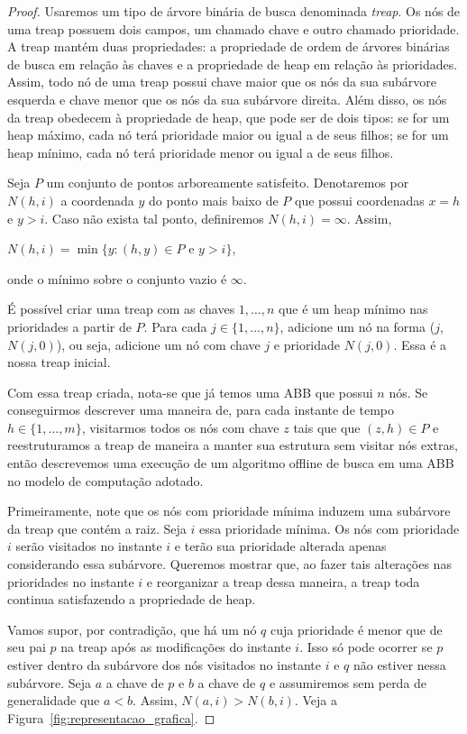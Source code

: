 \begin{proof}
Usaremos um tipo de árvore binária de busca denominada \textit{treap}. Os nós de uma treap possuem dois campos, um chamado chave e outro chamado prioridade. A treap mantém duas propriedades: a propriedade de ordem de árvores binárias de busca em relação às chaves e a propriedade de heap em relação às prioridades. Assim, todo nó de uma treap possui chave maior que os nós da sua subárvore esquerda e chave menor que os nós da sua subárvore direita. Além disso, os nós da treap obedecem à propriedade de heap, que pode ser de dois tipos: se for um heap máximo, cada nó terá prioridade maior ou igual a de seus filhos; se for um heap mínimo, cada nó terá prioridade menor ou igual a de seus filhos.

Seja $P$ um conjunto de pontos arboreamente satisfeito. Denotaremos por $N(h,i)$ a coordenada $y$ do ponto mais baixo de $P$ que possui coordenadas $x = h$ e $y > i$. Caso não exista tal ponto, definiremos $N(h,i) = \infty$. Assim, 
\begin{center}
    $N(h,i) = \min\{y : (h,y) \in P \text{ e } y > i\}$,
\end{center}
onde o mínimo sobre o conjunto vazio é $\infty$.

É possível criar uma treap com as chaves $1,\ldots,n$ que é um heap mínimo nas prioridades a partir de $P$. Para cada $j \in \{1,\ldots,n\}$, adicione um nó na forma ($j$, $N(j,0)$), ou seja, adicione um nó com chave $j$ e prioridade $N(j,0)$. Essa é a nossa treap inicial.

Com essa treap criada, nota-se que já temos uma ABB que possui $n$ nós. Se conseguirmos descrever uma maneira de, para cada instante de tempo $h \in \{1,\ldots,m\}$, visitarmos todos os nós com chave $z$ tais que que $(z,h) \in P$ e reestruturamos a treap de maneira a manter sua estrutura sem visitar nós extras, então descrevemos uma execução de um algoritmo offline de busca em uma ABB no modelo de computação adotado.

Primeiramente, note que os nós com prioridade mínima induzem uma subárvore da treap que contém a raiz.
Seja $i$ essa prioridade mínima. Os nós com prioridade $i$ serão visitados no instante $i$ e terão sua prioridade alterada apenas considerando essa subárvore. Queremos mostrar que, ao fazer tais alterações nas prioridades no instante $i$ e reorganizar a treap dessa maneira, a treap toda continua satisfazendo a propriedade de heap.

Vamos supor, por contradição, que há um nó $q$ cuja prioridade é menor que de seu pai $p$ na treap após as modificações do instante $i$. Isso só pode ocorrer se $p$ estiver dentro da subárvore dos nós visitados no instante $i$ e $q$ não estiver nessa subárvore. Seja $a$ a chave de $p$ e $b$ a chave de $q$ e assumiremos sem perda de generalidade que $a < b$. Assim, $N(a,i) > N(b,i)$. Veja a Figura~\ref{fig:representacao_grafica}.


\end{proof}
